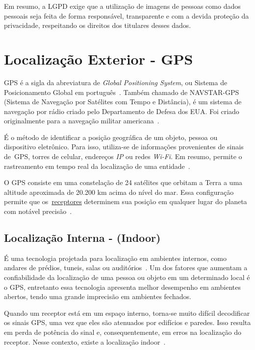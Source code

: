 Em resumo, a LGPD exige que a utilização de imagens de pessoas como dados pessoais seja feita de forma responsável, transparente e com a devida proteção da privacidade, respeitando os direitos dos titulares desses dados.


\section{Localização Exterior - GPS}\label{sec:localizacao}
GPS é a sigla da abreviatura de \textit{Global Positioning System}, ou Sistema de Posicionamento Global em português~\cite{gpsdesigning}.
Também chamado de NAVSTAR-GPS (Sistema de Navegação por Satélites com Tempo e Distância), é um sistema de navegação por rádio criado pelo Departamento de Defesa dos EUA. Foi criado originalmente para a navegação militar americana~\cite{novais2014localizaccao}.

É o método de identificar a posição geográfica de um objeto, pessoa ou dispositivo eletrônico.
Para isso, utiliza-se de informações provenientes de sinais de~\hypertarget{receptores}{GPS, torres de celular, endereços \textit{IP} ou redes  \textit{Wi-Fi}}.
Em resumo, permite o rastreamento em tempo real da localização de uma entidade~\cite{da2019sistemas}.

O GPS consiste em uma constelação de 24 satélites que orbitam a Terra a uma altitude aproximada de 20.200 km acima do nível do mar.
Essa configuração permite que os~\hyperlink{receptores}{receptores} determinem sua posição em qualquer lugar do planeta com notável precisão~\cite{el2002introduction}.

\subsection{Localização Interna - (Indoor)}\label{subsec:localizacao-indoor}

É uma tecnologia projetada para localização em ambientes internos, como andares de prédios, tuneis, salas ou auditórios~\cite{mittelstadt2018bluepath}.
Um dos fatores que aumentam a confiabilidade da localização de uma pessoa ou objeto em um determinado local é o GPS, entretanto essa tecnologia apresenta melhor desempenho em ambientes abertos, tendo uma grande imprecisão em ambientes fechados.

Quando um receptor está em um espaço interno, torna-se muito difícil decodificar os sinais GPS, uma vez que eles são atenuados por edifícios e paredes.
Isso resulta em perda de potência do sinal e, consequentemente, em erros na localização do receptor.
Nesse contexto, existe a localização indoor~\cite{mittelstadt2018bluepath}.


